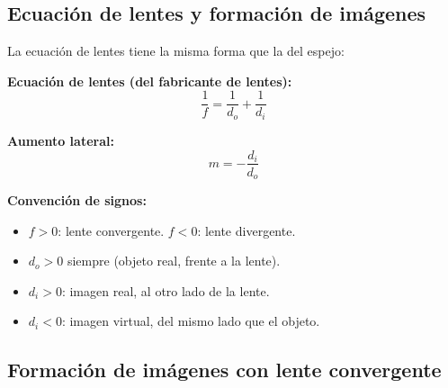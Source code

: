 \subsection{Ecuación de lentes y formación de imágenes}

\begin{seccion}
La ecuación de lentes tiene la misma forma que la del espejo:

\begin{ecuacion}
\textbf{Ecuación de lentes (del fabricante de lentes):}
$$\frac{1}{f} = \frac{1}{d_o} + \frac{1}{d_i}$$

\textbf{Aumento lateral:}
$$m = -\frac{d_i}{d_o}$$

\textbf{Convención de signos:}
\begin{itemize}
    \item $f > 0$: lente convergente. \quad $f < 0$: lente divergente.
    \item $d_o > 0$ siempre (objeto real, frente a la lente).
    \item $d_i > 0$: imagen real, al otro lado de la lente.
    \item $d_i < 0$: imagen virtual, del mismo lado que el objeto.
\end{itemize}
\end{ecuacion}
\end{seccion}

\subsection{Formación de imágenes con lente convergente}

